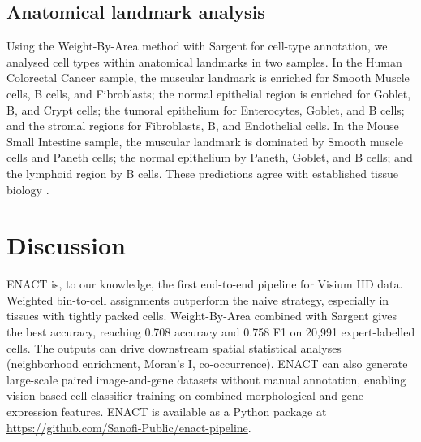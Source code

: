 \documentclass[11pt]{article}
\begin{document}
\subsection{Anatomical landmark analysis}
Using the Weight-By-Area method with Sargent for cell-type annotation, we analysed cell types within anatomical landmarks in two samples. In the Human Colorectal Cancer sample, the muscular landmark is enriched for Smooth Muscle cells, B cells, and Fibroblasts; the normal epithelial region is enriched for Goblet, B, and Crypt cells; the tumoral epithelium for Enterocytes, Goblet, and B cells; and the stromal regions for Fibroblasts, B, and Endothelial cells. In the Mouse Small Intestine sample, the muscular landmark is dominated by Smooth muscle cells and Paneth cells; the normal epithelium by Paneth, Goblet, and B cells; and the lymphoid region by B cells. These predictions agree with established tissue biology \citep{r15,r16,r17}.

\section{Discussion}
ENACT is, to our knowledge, the first end-to-end pipeline for Visium HD data. Weighted bin-to-cell assignments outperform the naive strategy, especially in tissues with tightly packed cells. Weight-By-Area combined with Sargent gives the best accuracy, reaching 0.708 accuracy and 0.758 F1 on 20,991 expert-labelled cells. The outputs can drive downstream spatial statistical analyses (neighborhood enrichment, Moran's I, co-occurrence). ENACT can also generate large-scale paired image-and-gene datasets without manual annotation, enabling vision-based cell classifier training on combined morphological and gene-expression features. ENACT is available as a Python package at \url{https://github.com/Sanofi-Public/enact-pipeline}.



\end{document}
